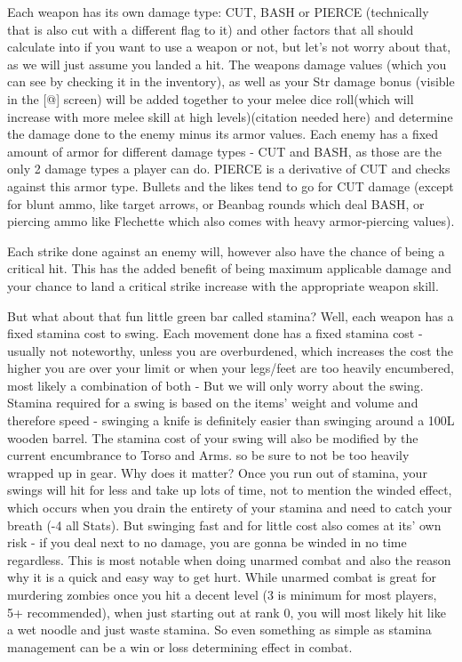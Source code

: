 \documentclass[11pt]{report}
\begin{document}
Each weapon has its own damage type: CUT, BASH or PIERCE (technically that is also cut with a different flag to it) and other factors that all should calculate into if you want to use a weapon or not, but let's not worry about that, as we will just assume you landed a hit. The weapons damage values (which you can see by checking it in the inventory), as well as your Str damage bonus (visible in the [@] screen) will be added together to your melee dice roll(which will increase with more melee skill at high levels)(citation needed here) and determine the damage done to the enemy minus its armor values. Each enemy has a fixed amount of armor for different damage types - CUT and BASH, as those are the only 2 damage types a player can do. PIERCE is a derivative of CUT and checks against this armor type. Bullets and the likes tend to go for CUT damage (except for blunt ammo, like target arrows, or Beanbag rounds which deal BASH, or piercing ammo like Flechette which also comes with heavy armor-piercing values).

Each strike done against an enemy will, however also have the chance of being a critical hit. This has the added benefit of being maximum applicable damage and your chance to land a critical strike increase with the appropriate weapon skill.

But what about that fun little green bar called stamina? Well, each weapon has a fixed stamina cost to swing. Each movement done has a fixed stamina cost - usually not noteworthy, unless you are overburdened, which increases the cost the higher you are over your limit or when your legs/feet are too heavily encumbered, most likely a combination of both - But we will only worry about the swing. Stamina required for a swing is based on the items' weight and volume and therefore speed - swinging a knife is definitely easier than swinging around a 100L wooden barrel. The stamina cost of your swing will also be modified by the current encumbrance to Torso and Arms. so be sure to not be too heavily wrapped up in gear. Why does it matter? Once you run out of stamina, your swings will hit for less and take up lots of time, not to mention the winded effect, which occurs when you drain the entirety of your stamina and need to catch your breath (-4 all Stats). But swinging fast and for little cost also comes at its' own risk - if you deal next to no damage, you are gonna be winded in no time regardless. This is most notable when doing unarmed combat and also the reason why it is a quick and easy way to get hurt. While unarmed combat is great for murdering zombies once you hit a decent level (3 is minimum for most players, 5+ recommended), when just starting out at rank 0, you will most likely hit like a wet noodle and just waste stamina. So even something as simple as stamina management can be a win or loss determining effect in combat.
\end{document}
